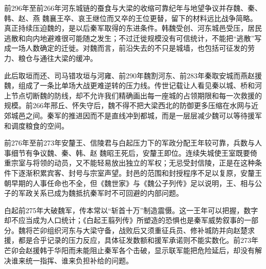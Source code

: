 \begin{event}{前296年至前266年}{河东城链的蚕食与大梁的收缩}{可靠纪年与地望争议并存}{魏、秦、韩、赵、燕}
魏襄王卒、哀王继位而又卒的王位更替，留下的材料远比战争简略。真正持续压迫魏的，是以后秦军取得的东进条件。韩魏受创、河东城邑受压，居民逃散和向内地避难很可能随之发生；不过迁徙规模没有可信统计，不能把“逃散”写成一场人数确定的迁徙。对魏而言，前沿失去的不只是城墙，也包括可征发的劳力、粮仓与通往大梁的缓冲。

此后取垣而还、司马错攻垣与河雍、前290年魏割河东、前283年秦取安城而燕赵援魏，组成了一条比单场大战更难逆转的压力线。传世记载让人看见秦以城、桥和河上节点切断魏的防线，却不允许我们精确画出每一座城的占领期限和每一次救援的规模。前266年邢丘、怀失守后，魏不得不把大梁西北的防御更多压缩在水网与近郊城邑之间。秦军的推进因而不是直线冲到都城，而是一层层减少魏可以等待援军和调度粮食的空间。
\end{event}

\begin{event}{前276年至前273年}{安釐王、信陵君与白起压力下的军政分配}{王年较可靠，兵数与人事细节有争议}{魏、秦、韩、赵}
魏昭王死后，安釐王即位。连续失城使王室既要倚重宗室与将领的动员，又不能轻易放出独立的军权；无忌受封信陵，正是在这种条件下逐渐积累宾客、封号与宗室声望。封邑的范围和封授程序不足以复原，安釐王朝早期的人事任命也不全，但《魏世家》与《魏公子列传》足以说明，王、相与公子的军政关系已成为魏抵抗秦军时不可回避的内部问题。

白起前275年大破魏军，传本常以“斩首十万”制造震慑。这一王年可以把握，数字却不应当成为人口统计；《白起王翦列传》所塑造的恐惧也是秦军威势叙事的一部分。魏将芒卯组织河东与大梁守备，战败后又须重征兵员、修补城防并向赵楚求援，都是合乎记录的压力反应，具体征发数额和援军承诺则不能实数化。前273年芒卯会赵援韩于华阳而未能阻止秦军各个击破，显示联军能把危险延后，却没有解决谁来统一指挥、谁来负担补给的问题。
\end{event}

